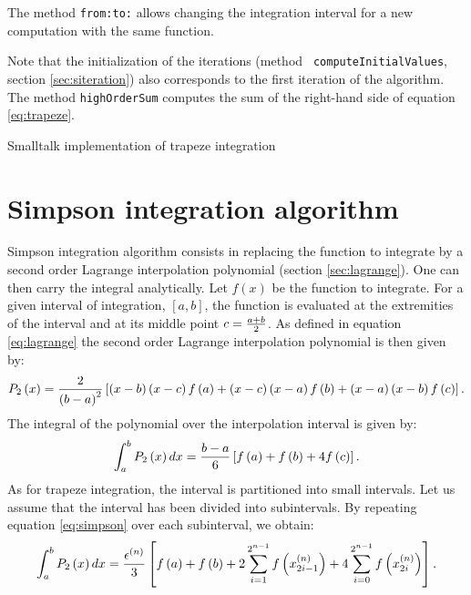 \documentclass[twoside]{book}
\begin{document}
The method {\tt from:to:} allows changing the integration interval
for a new computation with the same function.

Note that the initialization of the iterations (method {\tt
computeInitialValues}, \cf section \ref{sec:siteration}) also
corresponds to the first iteration of the algorithm. The method
{\tt highOrderSum} computes the sum of the right-hand side of
equation \ref{eq:trapeze}.

\begin{listing} Smalltalk implementation of trapeze integration
\label{ls:trapeze}

\end{listing}


\section{Simpson integration algorithm}
Simpson integration algorithm consists
in replacing the function to integrate by a second order Lagrange
interpolation polynomial\cite{Bass} (\cf section
\ref{sec:lagrange}). One can then carry the integral analytically.
Let $f\left(x\right)$ be the function to integrate. For a given
interval of integration, $\left[a,b\right]$, the function is
evaluated at the extremities of the interval and at its middle
point $c={a+b \over 2}$. As defined in equation \ref{eq:lagrange}
the second order Lagrange interpolation polynomial is then given
by:
\begin{equation}
  P_2\left(x\right)={2\over \left(b-a\right)^2}\left[\left(x-b\right)\left(x-c\right)f\left(a\right) +\left(x-c\right)\left(x-a\right)f\left(b\right) +
  \left(x-a\right)\left(x-b\right)f\left(c\right)\right].
\end{equation}
The integral of the polynomial over the interpolation interval is
given by:
\begin{equation}
\label{eq:simpson} \int_a^b P_2\left(x\right)dx={b-a \over
6}\left[f\left(a\right) + f\left(b\right) + 4 f\left(c\right)
\right].
\end{equation}
As for trapeze integration, the interval is partitioned into small
intervals. Let us assume that the interval has been divided into
subintervals. By repeating equation \ref{eq:simpson} over each
subinterval, we obtain:
\begin{equation}
\label{eq:simpsum} \int_a^b
P_2\left(x\right)dx={\epsilon^{\left(n\right)} \over
3}\left[f\left(a\right) + f\left(b\right) + 2 \sum_{i=1}^{2^{n-1}}
f\left(x_{2i-1}^{\left(n\right)}\right) + 4 \sum_{i=0}^{2^{n-1}}
f\left(x_{2i}^{\left(n\right)}\right) \right].
\end{equation}
\end{document}
